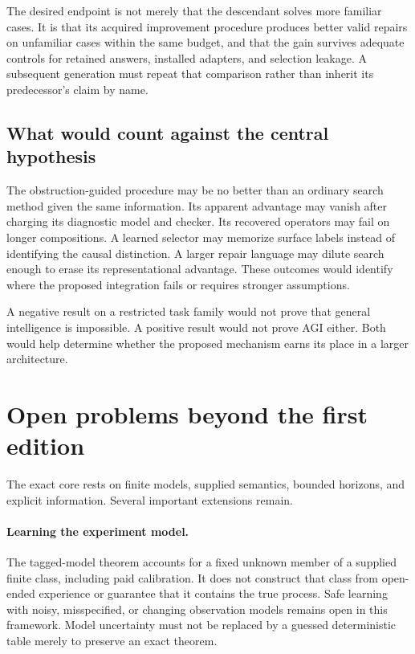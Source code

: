 \documentclass[11pt,letterpaper]{article}
\theoremstyle{plain}
\theoremstyle{definition}
\begin{document}
The desired endpoint is not merely that the descendant solves more familiar cases. It is that its acquired improvement procedure produces better valid repairs on unfamiliar cases within the same budget, and that the gain survives adequate controls for retained answers, installed adapters, and selection leakage. A subsequent generation must repeat that comparison rather than inherit its predecessor's claim by name.

\subsection{What would count against the central hypothesis}
The obstruction-guided procedure may be no better than an ordinary search method given the same information. Its apparent advantage may vanish after charging its diagnostic model and checker. Its recovered operators may fail on longer compositions. A learned selector may memorize surface labels instead of identifying the causal distinction. A larger repair language may dilute search enough to erase its representational advantage. These outcomes would identify where the proposed integration fails or requires stronger assumptions.

A negative result on a restricted task family would not prove that general intelligence is impossible. A positive result would not prove AGI either. Both would help determine whether the proposed mechanism earns its place in a larger architecture.

\section{Open problems beyond the first edition}\label{sec:limits}
The exact core rests on finite models, supplied semantics, bounded horizons, and explicit information. Several important extensions remain.

\paragraph{Learning the experiment model.}
The tagged-model theorem accounts for a fixed unknown member of a supplied finite class, including paid calibration. It does not construct that class from open-ended experience or guarantee that it contains the true process. Safe learning with noisy, misspecified, or changing observation models remains open in this framework. Model uncertainty must not be replaced by a guessed deterministic table merely to preserve an exact theorem.
\end{document}
